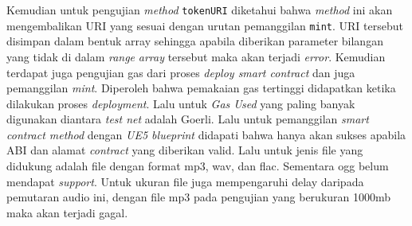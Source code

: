 Kemudian untuk pengujian \emph{method} \texttt{tokenURI} diketahui bahwa \emph{method} ini akan mengembalikan URI yang sesuai dengan urutan pemanggilan \texttt{mint}.
URI tersebut disimpan dalam bentuk array sehingga apabila diberikan parameter bilangan yang tidak di dalam \emph{range} \emph{array} tersebut maka akan terjadi \emph{error}.
Kemudian terdapat juga pengujian gas dari proses \emph{deploy smart contract} dan juga pemanggilan \emph{mint}. Diperoleh bahwa pemakaian gas tertinggi didapatkan ketika dilakukan proses
\emph{deployment}. Lalu untuk \emph{Gas Used} yang paling banyak digunakan diantara \emph{test net} adalah Goerli. Lalu untuk pemanggilan \emph{smart contract method} dengan \emph{UE5 blueprint} didapati bahwa
hanya akan sukses apabila ABI dan alamat \emph{contract} yang diberikan valid. Lalu untuk jenis file yang didukung adalah file dengan format mp3, wav, dan flac. Sementara ogg belum mendapat \emph{support}.
Untuk ukuran file juga mempengaruhi delay daripada pemutaran audio ini, dengan file mp3 pada pengujian yang berukuran 1000mb maka akan terjadi gagal.

